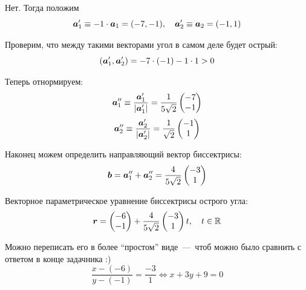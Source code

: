 \documentclass[a4paper,12pt]{article}
\begin{document}
\begin{solution}
    Нет.
    Тогда положим
    \[
      \boldsymbol a_1' \equiv -1 \cdot \boldsymbol a_1 = (-7, -1),\quad \boldsymbol a_2' \equiv \boldsymbol a_2 = (-1, 1)
    \]
    
    Проверим, что между такими векторами угол в самом деле будет острый:
    \[
      (\boldsymbol a_1', \boldsymbol a_2') = -7 \cdot (-1) - 1 \cdot 1 > 0
    \]
    
    Теперь отнормируем:
    \[
      \boldsymbol a_1'' \equiv \frac{\boldsymbol a_1'}{|\boldsymbol a_1'|} = \frac{1}{5\sqrt{2}} \begin{pmatrix}
        -7 \\ -1
      \end{pmatrix}
    \]
    \[
      \boldsymbol a_2'' \equiv \frac{\boldsymbol a_2'}{|\boldsymbol a_2'|} = \frac{1}{\sqrt{2}} \begin{pmatrix}
        -1 \\ 1
      \end{pmatrix}
    \]
    
    Наконец можем определить направляющий вектор биссектрисы:
    \[
      \boldsymbol b = \boldsymbol a_1'' + \boldsymbol a_2'' = \frac{4}{5 \sqrt{2}} \begin{pmatrix}
        -3 \\ 1
      \end{pmatrix}
    \]
    
    Векторное параметрическое уравнение биссектрисы острого угла:
    \[
      \boldsymbol r = \begin{pmatrix}
        -6 \\ -1
      \end{pmatrix} + \frac{4}{5 \sqrt{2}} \begin{pmatrix}
        -3 \\ 1
      \end{pmatrix} t,\quad t \in \operatorname{\mathbb R}
    \]
    
    Можно переписать его в более ``простом'' виде~---~чтоб можно было сравнить с ответом в конце задачника :)
    \[
      \frac{x - (-6)}{y - (-1)} = \frac{-3}{1} \Leftrightarrow x + 3y + 9 = 0
    \]
  \end{solution}
  
  
  
\end{document}
